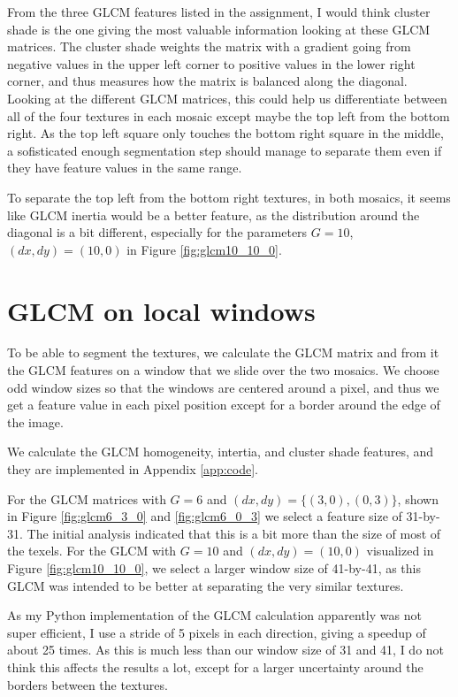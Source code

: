 \documentclass[a4paper]{article}
\begin{document}
From the three GLCM features listed in the assignment, I would think
cluster shade is the one giving the most valuable information looking at
these GLCM matrices. The cluster shade weights the matrix with a
gradient going from negative values in the upper left corner to positive
values in the lower right corner, and thus measures how the matrix is
balanced along the diagonal. Looking at the different GLCM matrices,
this could help us differentiate between all of the four textures in
each mosaic except maybe the top left from the bottom right. As the top
left square only touches the bottom right square in the middle, a
sofisticated enough segmentation step should manage to separate them
even if they have feature values in the same range.

To separate the top left from the bottom right textures, in both
mosaics, it seems like GLCM inertia would be a better feature, as the
distribution around the diagonal is a bit different, especially for the
parameters $G = 10$, $(dx, dy) = (10, 0)$ in Figure
\ref{fig:glcm10_10_0}.

\section{GLCM on local windows}

To be able to segment the textures, we calculate the GLCM matrix and
from it the GLCM features on a window that we slide over the two
mosaics. We choose odd window sizes so that the windows are centered
around a pixel, and thus we get a feature value in each pixel position
except for a border around the edge of the image. 

We calculate the GLCM homogeneity, intertia, and cluster shade features,
and they are implemented in Appendix \ref{app:code}.

For the GLCM matrices with $G = 6$ and $(dx, dy) = \{(3, 0), (0, 3)\}$,
shown in Figure \ref{fig:glcm6_3_0} and \ref{fig:glcm6_0_3} we select a
feature size of 31-by-31. The initial analysis indicated that this is a
bit more than the size of most of the texels. For the GLCM with $G = 10$ and
$(dx, dy) = (10, 0)$ visualized in Figure \ref{fig:glcm10_10_0}, we
select a larger window size of 41-by-41, as this GLCM was intended to be
better at separating the very similar textures.

As my Python implementation of the GLCM calculation apparently was not
super efficient, I use a stride of 5 pixels in each direction, giving a
speedup of about 25 times. As this is much less than our window size of
31 and 41, I do not think this affects the results a lot, except for a
larger uncertainty around the borders between the textures.
\end{document}
